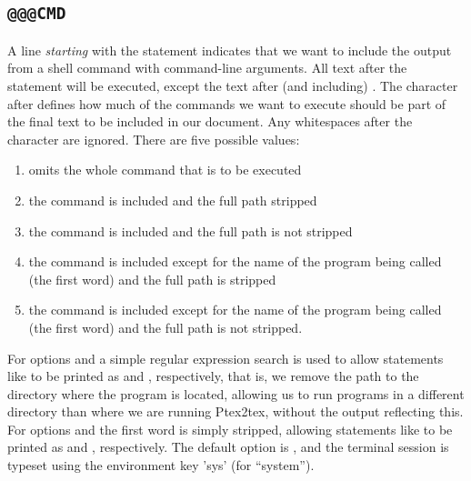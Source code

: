 \documentclass[a4paper,11pt]{article}
\begin{document}
{\subsection{\texttt{@@@CMD}}
A line \emph{starting} with the statement  indicates that we want to include
the output from a shell command with command-line arguments. All text after
the statement  will be executed, except the text after (and including)
. The character after  defines how much of the commands we
want to execute should be part of the final text to be included in our
document. Any whitespaces after the character are ignored. There are five possible values:
\begin{enumerate}
\item
{} omits the whole command that is to be executed
\item
{} the command is included and the full path stripped
\item
{} the command is included and the full path is not stripped
\item
{} the command is included except for the name of the program being
called (the first word) and the full path is stripped
\item
{} the command is included except for the name of the program being
called (the first word) and the full path is not stripped. 
\end{enumerate}
For options  and  a simple regular expression search is used
to allow statements like 
to be printed as  and ,
respectively, that is, we remove the path to the directory where
the program is located, allowing us to run programs in a different directory
than where we are running Ptex2tex, without the output reflecting this.
For options  and  the first word is simply stripped,
allowing statements like  to be printed as 
and , respectively. The default option is ,
and the terminal session is typeset using the environment key 'sys' (for ``system'').

}
\end{document}
